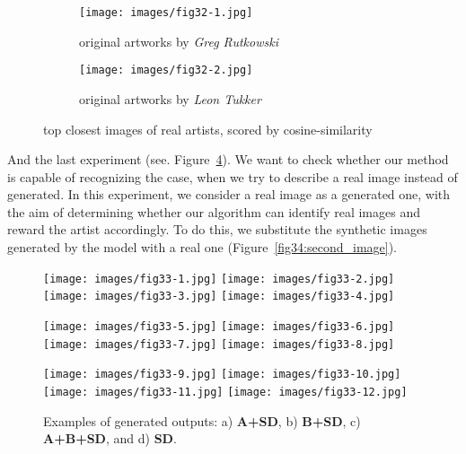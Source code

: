 \documentclass[12pt, letterpaper]{article}
\begin{document}
\begin{figure}[h]
    \centering
    \begin{subfigure}{0.48\textwidth}
        \centering
        \texttt{[image: images/fig32-1.jpg]}
        \caption{original artworks by \textit{Greg Rutkowski}}
        \label{fig32:first_image}
    \end{subfigure}
    \begin{subfigure}{0.48\textwidth}
        \centering
        \texttt{[image: images/fig32-2.jpg]}
        \caption{original artworks by \textit{Leon Tukker}}
        \label{fig32:second_image}
    \end{subfigure}
    \caption{top closest images of real artists, scored by cosine-similarity}
    \label{fig32:all_images}    
\end{figure}

And the last experiment (see. Figure~\ref{fig33:all_images}). We want to check whether our method is capable of recognizing the case, when we try to describe a real image instead of generated.
In this experiment, we consider a real image as a generated one, with the aim of determining whether our algorithm can identify real images and reward the artist accordingly. To do this, we substitute the synthetic images generated by the model with a real one (Figure~\ref{fig34:second_image}).

\begin{figure}[h]
    \centering
    \begin{minipage}{\textwidth}
        \centering
        \texttt{[image: images/fig33-1.jpg]}
        \texttt{[image: images/fig33-2.jpg]}
        \texttt{[image: images/fig33-3.jpg]}
        \texttt{[image: images/fig33-4.jpg]}
        \label{fig33:row_a}
    \end{minipage}
    \begin{minipage}{\textwidth}
        \centering
        \texttt{[image: images/fig33-5.jpg]}
        \texttt{[image: images/fig33-6.jpg]}
        \texttt{[image: images/fig33-7.jpg]}
        \texttt{[image: images/fig33-8.jpg]}
        \label{fig33:row_b}
    \end{minipage}
    \begin{minipage}{\textwidth}
        \centering
        \texttt{[image: images/fig33-9.jpg]}
        \texttt{[image: images/fig33-10.jpg]}
        \texttt{[image: images/fig33-11.jpg]}
        \texttt{[image: images/fig33-12.jpg]}
        \label{fig33:row_c}
    \end{minipage}
    \caption{Examples of generated outputs: a) \textbf{A+SD}, b) \textbf{B+SD}, c) \textbf{A+B+SD}, and d) \textbf{SD}.}
    \label{fig33:all_images}
\end{figure}
\end{document}
